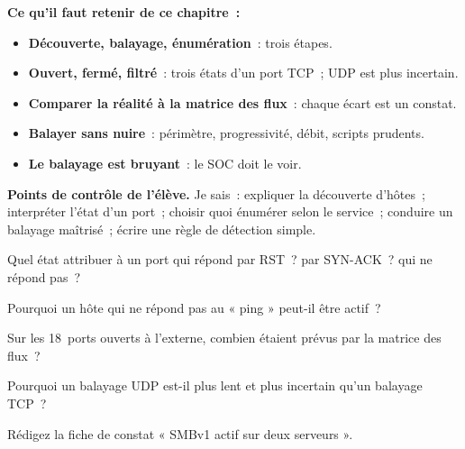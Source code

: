 \begin{boxresume}
\textbf{Ce qu'il faut retenir de ce chapitre~:}
\begin{itemize}
    \item \textbf{Découverte, balayage, énumération}~: trois étapes.
    \item \textbf{Ouvert, fermé, filtré}~: trois états d'un port TCP~; UDP est
          plus incertain.
    \item \textbf{Comparer la réalité à la matrice des flux}~: chaque écart
          est un constat.
    \item \textbf{Balayer sans nuire}~: périmètre, progressivité, débit,
          scripts prudents.
    \item \textbf{Le balayage est bruyant}~: le SOC doit le voir.
\end{itemize}
\end{boxresume}

\begin{boxinfo}
\textbf{Points de contrôle de l'élève.} Je sais~: expliquer la découverte
d'hôtes~; interpréter l'état d'un port~; choisir quoi énumérer selon le
service~; conduire un balayage maîtrisé~; écrire une règle de détection
simple.
\end{boxinfo}

\bigskip

\begin{boxexo}[title={\ding{45}\quad Exercice~6.1. Les états \niveaubase}]
Quel état attribuer à un port qui répond par RST~? par SYN-ACK~? qui ne
répond pas~?
\end{boxexo}

\begin{boxexo}[title={\ding{45}\quad Exercice~6.2. Le ping \niveaubase}]
Pourquoi un hôte qui ne répond pas au « ping » peut-il être actif~?
\end{boxexo}

\begin{boxexo}[title={\ding{45}\quad Exercice~6.3. Les écarts \niveaubase}]
Sur les 18~ports ouverts à l'externe, combien étaient prévus par la
matrice des flux~?
\end{boxexo}

\begin{boxexo}[title={\ding{45}\quad Exercice~6.4. UDP \niveaumoyen}]
Pourquoi un balayage UDP est-il plus lent et plus incertain qu'un balayage
TCP~?
\end{boxexo}

\begin{boxexo}[title={\ding{45}\quad Exercice~6.5. SMBv1 \niveaumoyen}]
Rédigez la fiche de constat « SMBv1 actif sur deux serveurs ».
\end{boxexo}

